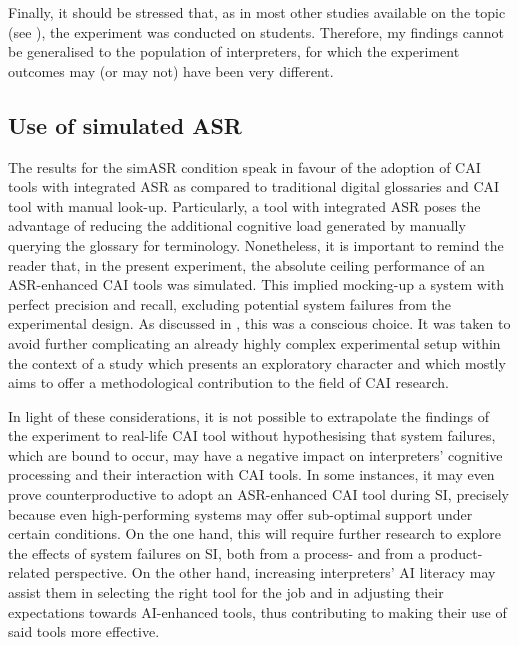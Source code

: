 Finally, it should be stressed that, as in most other studies available on the topic (see ), the experiment was conducted on students. Therefore, my findings cannot be generalised to the population of interpreters, for which the experiment outcomes may (or may not) have been very different.

\subsection{Use of simulated ASR}
The results for the simASR condition speak in favour of the adoption of CAI tools with integrated ASR as compared to traditional digital glossaries and CAI tool with manual look-up. Particularly, a tool with integrated ASR poses the advantage of reducing the additional cognitive load generated by manually querying the glossary for terminology. Nonetheless, it is important to remind the reader that, in the present experiment, the absolute ceiling performance of an ASR-enhanced CAI tools was simulated. This implied mocking-up a system with perfect precision and recall, excluding potential system failures from the experimental design. As discussed in , this was a conscious choice. It was taken to avoid further complicating an already highly complex experimental setup within the context of a study which presents an exploratory character and which mostly aims to offer a methodological contribution to the field of CAI research.

In light of these considerations, it is not possible to extrapolate the findings of the experiment to real-life CAI tool without hypothesising that system failures, which are bound to occur, may have a negative impact on interpreters' cognitive processing and their interaction with CAI tools. In some instances, it may even prove counterproductive to adopt an ASR-enhanced CAI tool during SI, precisely because even high-performing systems may offer sub-optimal support under certain conditions. On the one hand, this will require further research to explore the effects of system failures on SI, both from a process- and from a product-related perspective. On the other hand, increasing interpreters' AI literacy may assist them in selecting the right tool for the job and in adjusting their expectations towards AI-enhanced tools, thus contributing to making their use of said tools more effective.

